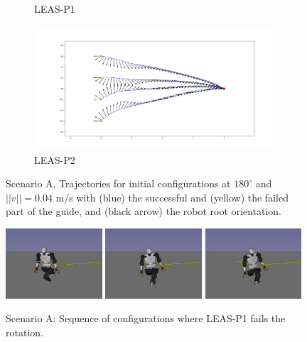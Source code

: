 \begin{figure}[ht]
\begin{subfigure}[t]{0.49\linewidth}
    \caption{LEAS-P1}
    \label{fig:cp-sb:rotation_scenario:leas_p1}
    \end{subfigure}
    \begin{subfigure}[t]{0.49\linewidth}
    \includegraphics[width=\textwidth]{Figures/Chapter_CPSB/rotation_p2_180_v04.png}
    \caption{LEAS-P2}
    \label{fig:cp-sb:rotation_scenario:leas_p2}
    \end{subfigure}
    \caption{Scenario A, Trajectories for initial configurations at $180^{\circ}$ and $||v||=0.04$ m/s with (blue) the successful and (yellow) the failed part of the guide, and (black arrow) the robot root orientation.}
    \label{fig:cp-sb:rotation_scenario}
\end{figure}
\begin{figure}[ht]
    \captionsetup[subfigure]{justification=centering}
    \centering
    \includegraphics[trim={2cm 2cm 4cm 2cm}, clip,width=0.32\textwidth]{Figures/Chapter_CPSB/rotation_seq/rot2.png}
    \includegraphics[trim={2cm 2cm 4cm 2cm}, clip,width=0.32\textwidth]{Figures/Chapter_CPSB/rotation_seq/rot3.png}
    \includegraphics[trim={2cm 2cm 4cm 2cm}, clip,width=0.32\textwidth]{Figures/Chapter_CPSB/rotation_seq/rot4.png}
    \caption{Scenario A: Sequence of configurations where LEAS-P1 fails the rotation.}
    \label{fig:cp-sb:rotation_leas_p1_fail}
\end{figure}


